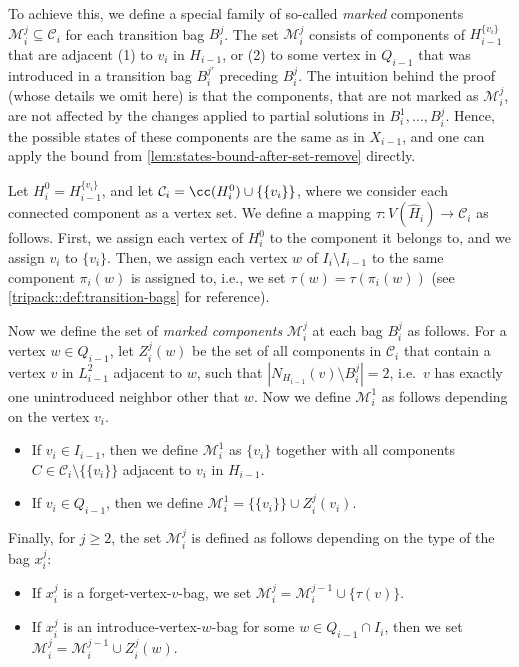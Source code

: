 \documentclass[a4paper,UKenglish,cleveref, autoref, thm-restate]{lipics-v2021}
\begin{document}
To achieve this, we define a special family of so-called \emph{marked} components $\mathcal{M}_i^j\subseteq \mathcal{C}_i$ for each transition bag $B_i^j$.
The set $\mathcal{M}_i^j$ consists of components of $H_{i-1}^{\{v_i\}}$ that are adjacent (1) to $v_i$ in $H_{i-1}$, or (2) to some vertex in $Q_{i-1}$ that was introduced in a transition bag $B_i^{j'}$ preceding $B_i^j$.
The intuition behind the proof (whose details we omit here) is that the components, that are not marked as $\mathcal{M}_i^j$, are not affected by the changes applied to partial solutions in $B_i^1,\dots, B_i^j$. 
Hence, the possible states of these components are the same as in $X_{i-1}$, and one can apply the bound from \cref{lem:states-bound-after-set-remove} directly.
\begin{definition}
    Let $H_i^0 = H_{i-1}^{\{v_i\}}$, and let $\mathcal{C}_i = \cc(H_i^0) \cup \{\{v_i\}\}$, where we consider each connected component as a vertex set.
    We define a mapping $\tau:V(\hat{H}_{i})\rightarrow \mathcal{C}_i$ as follows.
    First, we assign each vertex of $H_i^0$ to the component it belongs to, and we assign $v_i$ to $\{v_i\}$.
    Then, we assign each vertex $w$ of $I_i\setminus I_{i-1}$ to the same component $\pi_i(w)$ is assigned to, i.e., we set $\tau(w) = \tau(\pi_i(w))$ (see \cref{tripack::def:transition-bags} for reference).
    
    Now we define the set of \emph{marked components} $\mathcal{M}_i^j$ at each bag $B_i^j$ as follows.
    For a vertex $w\in Q_{i-1}$, let $Z_i^j(w)$ be the set of all components in $\mathcal{C}_i$ that contain a vertex $v$ in $L_{i-1}^2$ adjacent to $w$, such that $|N_{H_{i-1}}(v)\setminus B_i^j| = 2$, i.e.\ $v$ has exactly one unintroduced neighbor other that $w$. 
    Now we define $\mathcal{M}_i^1$ as follows depending on the vertex $v_i$.
    \begin{itemize}
	\item If $v_i\in I_{i-1}$, then we define $\mathcal{M}_i^1$ as $\{v_i\}$ together with all components $C \in \mathcal{C}_i \setminus \{\{v_i\}\}$ adjacent to $v_i$ in $H_{i-1}$.
       \item If $v_i\in Q_{i-1}$, then we define $\mathcal{M}_i^1 = \{\{v_i\}\}\cup Z_i^j(v_i)$. 
   \end{itemize}
    Finally, for $j \geq 2$, the set $\mathcal{M}_i^j$ is defined as follows depending on the type of the bag $x_i^j$:
    \begin{itemize}
    	\item If $x_i^j$ is a forget-vertex-$v$-bag, we set $\mathcal{M}_i^j = \mathcal{M}_i^{j-1} \cup \{\tau(v)\}$.
    	\item If $x_i^j$ is an introduce-vertex-$w$-bag for some $w \in Q_{i-1} \cap I_i$, then we set $\mathcal{M}_i^j = \mathcal{M}_i^{j-1} \cup Z_i^j(w)$.
    \end{itemize}
\end{definition}
\end{document}
